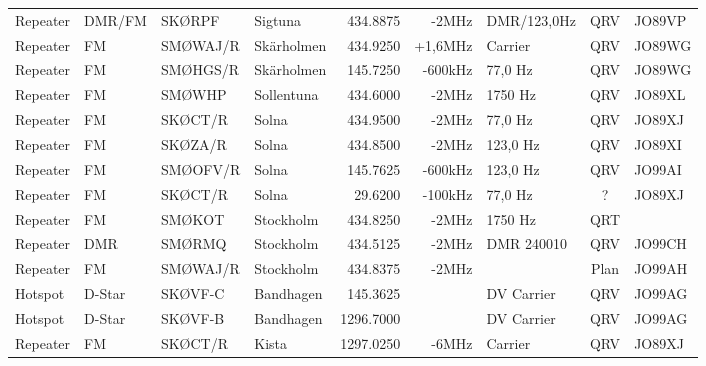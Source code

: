 \begin{landscape}
\begin{longtable}{llllrrlcl}
	Repeater          & DMR/FM       & SKØRPF        & Sigtuna      &          434.8875 &          -2MHz & DMR/123,0Hz    &       QRV       & JO89VP           \\
	Repeater          & FM           & SMØWAJ/R      & Skärholmen   &          434.9250 &        +1,6MHz & Carrier         &       QRV       & JO89WG           \\
	Repeater          & FM           & SMØHGS/R      & Skärholmen   &          145.7250 &        -600kHz & 77,0 Hz         &       QRV       & JO89WG           \\
	Repeater          & FM           & SMØWHP        & Sollentuna   &          434.6000 &          -2MHz & 1750 Hz         &       QRV       & JO89XL           \\
	Repeater          & FM           & SKØCT/R       & Solna        &          434.9500 &          -2MHz & 77,0 Hz         &       QRV       & JO89XJ           \\
	Repeater          & FM           & SKØZA/R       & Solna        &          434.8500 &          -2MHz & 123,0 Hz        &       QRV       & JO89XI           \\
	Repeater          & FM           & SMØOFV/R      & Solna        &          145.7625 &        -600kHz & 123,0 Hz        &       QRV       & JO99AI           \\
Repeater          & FM           & SKØCT/R       & Solna        &           29.6200 &        -100kHz & 77,0 Hz         &        ?        & JO89XJ           \\
	Repeater          & FM           & SMØKOT        & Stockholm    &          434.8250 &          -2MHz & 1750 Hz         &       QRT       &  \\
	Repeater          & DMR          & SMØRMQ        & Stockholm    &          434.5125 &          -2MHz & DMR 240010      &       QRV       & JO99CH           \\
	Repeater          & FM           & SMØWAJ/R      & Stockholm    &          434.8375 &          -2MHz &                 &      Plan       & JO99AH           \\
	Hotspot           & D-Star       & SKØVF-C       & Bandhagen    &          145.3625 &                & DV Carrier      &       QRV       & JO99AG           \\
	Hotspot           & D-Star       & SKØVF-B       & Bandhagen    &         1296.7000 &                & DV Carrier      &       QRV       & JO99AG           \\
	Repeater          & FM           & SKØCT/R       & Kista        &         1297.0250 &          -6MHz & Carrier         &       QRV       & JO89XJ           \\

\end{longtable}
\end{landscape}

